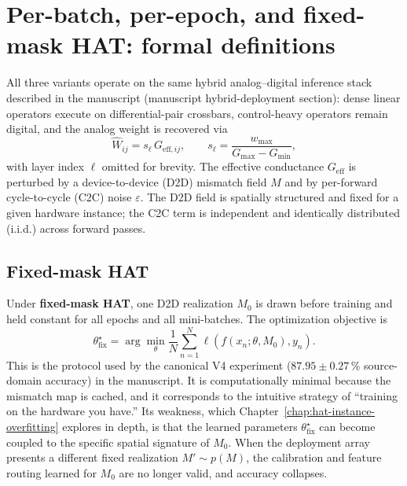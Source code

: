 \section{Per-batch, per-epoch, and fixed-mask HAT: formal definitions}
\label{sec:cadence-definitions}

All three variants operate on the same hybrid analog--digital inference stack described in the manuscript (manuscript hybrid-deployment section): dense linear operators execute on differential-pair crossbars, control-heavy operators remain digital, and the analog weight is recovered via
\begin{equation}
    \hat{W}_{ij} = s_{\ell}\,G_{\mathrm{eff},ij},
    \qquad
    s_{\ell}=\frac{w_{\max}}{G_{\max}-G_{\min}},
\label{eq:scale-recovery-ch3}
\end{equation}
with layer index $\ell$ omitted for brevity. The effective conductance $G_{\mathrm{eff}}$ is perturbed by a device-to-device (D2D) mismatch field $M$ and by per-forward cycle-to-cycle (C2C) noise $\varepsilon$. The D2D field is spatially structured and fixed for a given hardware instance; the C2C term is independent and identically distributed (i.i.d.) across forward passes.

\subsection{Fixed-mask HAT}

Under \textbf{fixed-mask HAT}, one D2D realization $M_{0}$ is drawn before training and held constant for all epochs and all mini-batches. The optimization objective is
\begin{equation}
    \theta_{\mathrm{fix}}^{\star}=\arg\min_{\theta}\frac{1}{N}\sum_{n=1}^{N}\ell\!\left(f(x_{n};\theta,M_{0}),y_{n}\right).
\label{eq:hat-fixed}
\end{equation}
This is the protocol used by the canonical V4 experiment ($87.95\pm0.27\,\%$ source-domain accuracy) in the manuscript. It is computationally minimal because the mismatch map is cached, and it corresponds to the intuitive strategy of ``training on the hardware you have.'' Its weakness, which Chapter~\ref{chap:hat-instance-overfitting} explores in depth, is that the learned parameters $\theta_{\mathrm{fix}}^{\star}$ can become coupled to the specific spatial signature of $M_{0}$. When the deployment array presents a different fixed realization $M'\sim p(M)$, the calibration and feature routing learned for $M_{0}$ are no longer valid, and accuracy collapses.

